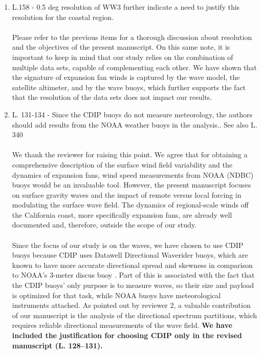 \documentclass{article}
\begin{document}
\begin{enumerate}
\begin{enumerate}
\item L.158 - 0.5 deg resolution of WW3 further indicate a need to justify this resolution for the coastal region.
\\\\
{\color{blue} Please refer to the previous items for a thorough discussion about resolution and the objectives of the present manuscript. On this same note, it is important to keep in mind that our study relies on the combination of multiple data sets, capable of complementing each other. We have shown that the signature of expansion fan winds is captured by the wave model, the satellite altimeter, and by the wave buoys, which further supports the fact that the resolution of the data sets does not impact our results.}
\\
\item L. 131-134 - Since the CDIP buoys do not measure meteorology, the authors should add results from the NOAA weather buoys in the analysis.. See also L. 340
\\\\
{\color{blue} We thank the reviewer for raising this point. We agree that for obtaining a comprehensive description of the surface wind field variability and the dynamics of expansion fans, wind speed measurements from NOAA (NDBC) buoys would be an invaluable tool. However, the present manuscript focuses on surface gravity waves and the impact of remote versus local forcing in modulating the surface wave field. The dynamics of regional-scale winds off the California coast, more specifically expansion fans, are already well documented \cite[e.g][]{dorman2013impact, koravcin2004coastal, taylor2008northerly} and, therefore, outside the scope of our study.
\\\\
Since the focus of our study is on the waves, we have chosen to use CDIP buoys because CDIP uses Datawell Directional Waverider buoys, which are known to have more accurate directional spread and skewness in comparison to NOAA's 3-meter discus buoy \cite[e.g][]{o1996comparison, gallet2014refraction}. Part of this is associated with the fact that the CDIP buoys' only purpose is to measure waves, so their size and payload is optimized for that task, while NOAA buoys have meteorological instruments attached. As pointed out by reviewer 2, a valuable contribution of our manuscript is the analysis of the directional spectrum partitions, which requires reliable directional measurements of the wave field. \textbf{We have included the justification for choosing CDIP only in the revised manuscript (L. 128--131).}
}
\end{enumerate}
\end{enumerate}
\end{document}
